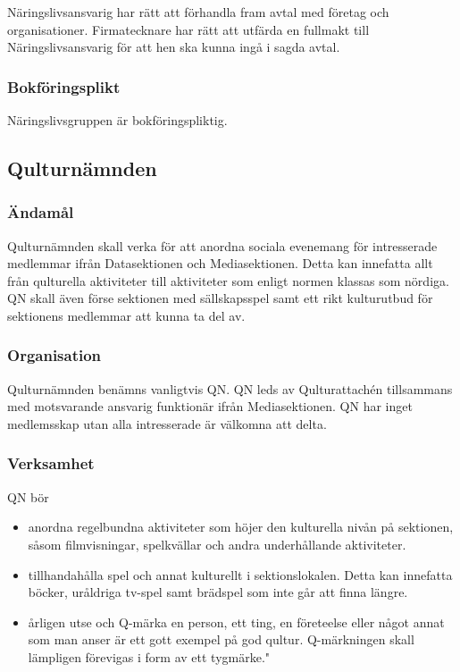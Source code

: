 \documentclass{dgovdoc}
\begin{document}
Näringslivsansvarig har rätt att förhandla fram avtal med företag och
organisationer. Firmatecknare har rätt att utfärda en fullmakt till Näringslivsansvarig för att hen ska kunna ingå i sagda avtal.

\subsubsection{Bokföringsplikt}
Näringslivsgruppen är bokföringspliktig.

\subsection{Qulturnämnden}

\subsubsection{Ändamål}

Qulturnämnden skall verka för att anordna sociala evenemang för intresserade medlemmar ifrån Datasektionen och Mediasektionen. Detta kan innefatta allt från qulturella aktiviteter till aktiviteter som enligt normen klassas som nördiga. QN skall även förse sektionen med sällskapsspel samt ett rikt kulturutbud för sektionens medlemmar att kunna ta del av.

\subsubsection{Organisation}

Qulturnämnden benämns vanligtvis QN. QN leds av Qulturattachén tillsammans med motsvarande ansvarig funktionär ifrån Mediasektionen. QN har inget medlemsskap utan alla intresserade är välkomna att delta.

\subsubsection{Verksamhet}

QN bör
\begin{itemize}
  \item anordna regelbundna aktiviteter som höjer den kulturella nivån på sektionen, såsom filmvisningar, spelkvällar och andra underhållande aktiviteter.
  \item tillhandahålla spel och annat kulturellt i sektionslokalen. Detta kan innefatta böcker, uråldriga tv-spel samt brädspel som inte går att finna längre.
  \item årligen utse och Q-märka en person, ett ting, en företeelse eller något annat som man anser är ett gott exempel på god qultur. Q-märkningen skall lämpligen förevigas i form av ett tygmärke."
\end{itemize}
\end{document}
